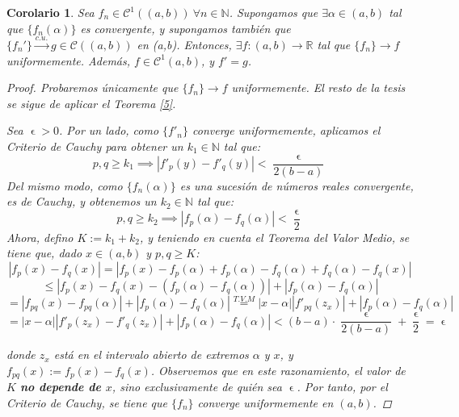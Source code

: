 \documentclass[11pt, a4paper]{article}
\let\epsilon\upvarepsilon
\newcommand{\fn}{\{f_n\}}
\theoremstyle{theorem-style}
\newtheorem{ncor}{Corolario}[section]
\theoremstyle{definition-style}
\theoremstyle{remark-style}
\theoremstyle{example-style}
\begin{document}
\begin{ncor}
  Sea $f_n\in \mathcal{C}^1((a,b)) \ \forall n \in \mathbb{N}$. Supongamos que $\exists \alpha \in (a,b)$ tal que $ \{f_n(\alpha)\}$ es convergente, y supongamos también que $\{f_n'\} \xrightarrow{c.u.} g \in \mathcal C((a,b))$ en (a,b). Entonces, $\exists f: (a,b) \to \mathbb{R}$ tal que $\fn \to f$ uniformemente. Además, $f \in \mathcal{C}^1(a,b)$, y  $f' = g$.

  \begin{proof}
    Probaremos únicamente que $\fn \to f$ uniformemente. El resto de la tesis se sigue de aplicar el \textit{Teorema \ref{5}}.
    
    Sea $\epsilon > 0$. Por un lado, como $\{f'_n\}$ converge uniformemente, aplicamos el \textit{Criterio de Cauchy} para obtener un $k_1 \in \mathbb{N}$ tal que: $$p,q \ge k_1 \implies |f'_p(y) - f'_q(y)| < \frac{\epsilon}{2 (b-a)}$$
    Del mismo modo, como $\{f_n(\alpha)\}$ es una sucesión de números reales convergente, es de Cauchy, y obtenemos un $k_2 \in \mathbb{N}$ tal que: $$p,q \ge k_2 \implies |f_p(\alpha) - f_q(\alpha)| < \frac{\epsilon}{2}$$
    Ahora, defino $K := k_1 + k_2$, y teniendo en cuenta el \textit{Teorema del Valor Medio}, se tiene que, dado $x \in (a,b)$ y $p,q \ge K$: $$|f_p(x) - f_q(x)| = |f_p(x) - f_p(\alpha) + f_p(\alpha) - f_q(\alpha) + f_q(\alpha) - f_q(x)|$$ $$\le |f_p(x) - f_q(x) - (f_p(\alpha) - f_q(\alpha))| + |f_p(\alpha) - f_q(\alpha)| $$ $$= |f_{pq}(x) - f_{pq}(\alpha)| + |f_p(\alpha) - f_q(\alpha)| \overset{T.V.M}{=} |x-\alpha||f'_{pq}(z_x)| + |f_p(\alpha) - f_q(\alpha)|$$ $$= \left|x-\alpha \right|\left| f'_p(z_x) - f'_q(z_x) \right| + |f_p(\alpha) - f_q(\alpha)| < (b-a) \cdot \frac{\epsilon}{2(b-a)} + \frac{\epsilon}{2} = \epsilon$$

    donde $z_x$ está en el intervalo abierto de extremos $\alpha$ y $x$, y $f_{pq}(x) := f_p(x) - f_q(x)$. Observemos que en este razonamiento, el valor de $K$ \textbf{no depende de $x$}, sino exclusivamente de quién sea $\epsilon$. Por tanto, por el \textit{Criterio de Cauchy}, se tiene que $\{f_n\}$ converge uniformemente en $(a,b)$.
  \end{proof}
  
\end{ncor}


\end{document}
